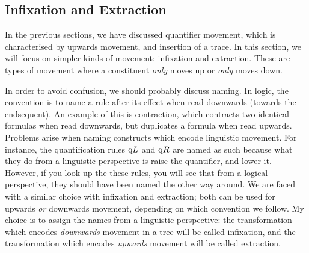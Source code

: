 
\subsection{Infixation and Extraction}
In the previous sections, we have discussed quantifier movement, which
is characterised by upwards movement, and insertion of a trace. In
this section, we will focus on simpler kinds of movement: infixation
and extraction. These are types of movement where a constituent
\emph{only} moves up or \emph{only} moves down.

In order to avoid confusion, we should probably discuss naming. In
logic, the convention is to name a rule after its effect when read
downwards (towards the endsequent). An example of this is contraction,
which contracts two identical formulas when read downwards, but
duplicates a formula when read upwards.
Problems arise when naming constructs which encode linguistic
movement. For instance, the quantification rules $\qup$ and $\qdown$
are named as such because what they do from a linguistic perspective
is raise the quantifier, and lower it. However, if you look up the
these rules, you will see that from a logical perspective, they should
have been named the other way around.
We are faced with a similar choice with infixation and extraction;
both can be used for upwards \emph{or} downwards movement, depending
on which convention we follow. My choice is to assign the names from a
linguistic perspective: the transformation which encodes
\emph{downwards} movement in a tree will be called infixation, and the
transformation which encodes \emph{upwards} movement will be called
extraction.



